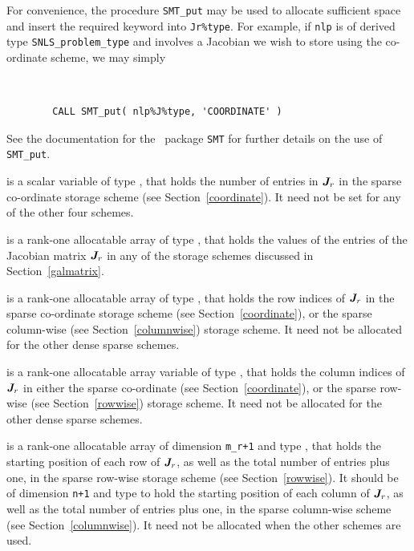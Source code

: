 \documentclass{galahad}
\newcommand{\packagename}{SNLS}
\begin{document}
\begin{description}
\begin{description}
For convenience, the procedure {\tt SMT\_put}
may be used to allocate sufficient space and insert the required keyword
into {\tt Jr\%type}.
For example, if {\tt nlp} is of derived type {\tt \packagename\_problem\_type}
and involves a Jacobian we wish to store using the co-ordinate scheme,
we may simply
{\tt
\begin{verbatim}
        CALL SMT_put( nlp%J%type, 'COORDINATE' )
\end{verbatim}
}
\noindent
See the documentation for the \galahad\ package {\tt SMT}
for further details on the use of {\tt SMT\_put}.

 is a scalar variable of type \integer, that
holds the number of entries in ${\bm{J}}_r$
in the sparse co-ordinate storage scheme (see Section~\ref{coordinate}).
It need not be set for any of the other four schemes.

 is a rank-one allocatable array of type \realdp, that holds
the values of the entries of the Jacobian matrix ${\bm{J}}_r$ in any of the
storage schemes discussed in Section~\ref{galmatrix}.

 is a rank-one allocatable array of type \integer,
that holds the row indices of ${\bm{J}}_r$ in the sparse co-ordinate storage
scheme (see Section~\ref{coordinate}), or the sparse column-wise
(see Section~\ref{columnwise}) storage scheme.
It need not be allocated for the other dense sparse schemes.

 is a rank-one allocatable array variable of type \integer,
that holds the column indices of ${\bm{J}}_r$ in either the sparse co-ordinate
(see Section~\ref{coordinate}), or the sparse row-wise
(see Section~\ref{rowwise}) storage scheme.
It need not be allocated for the other dense sparse schemes.

 is a rank-one allocatable array of dimension {\tt m\_r+1} and type
\integer, that holds the starting position of each row of ${\bm{J}}_r$, as well
as the total number of entries plus one, in the sparse row-wise storage
scheme (see Section~\ref{rowwise}). It should be of dimension {\tt n+1} and type
\integer to hold the starting position of each column of ${\bm{J}}_r$, as well
as the total number of entries plus one, in the sparse column-wise scheme
(see Section~\ref{columnwise}). It need not be allocated when the
other schemes are used.

\end{description}


\end{description}
\end{document}
